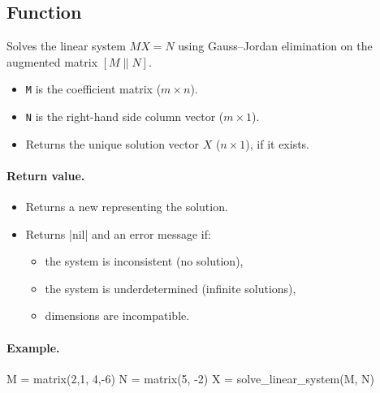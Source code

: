 \subsection{Function }
Solves the linear system $MX = N$ using Gauss–Jordan elimination on the augmented matrix $[M\|N]$.

\begin{itemize}
\item \texttt{M} is the coefficient matrix ($m \times n$).
\item \texttt{N} is the right-hand side column vector ($m \times 1$).
\item Returns the unique solution vector $X$ ($n \times 1$), if it exists.
\end{itemize}

\paragraph{Return value.}
\begin{itemize}
\item Returns a new  representing the solution.
\item Returns |nil| and an error message if:
\begin{itemize}
\item the system is inconsistent (no solution),
\item the system is underdetermined (infinite solutions),
\item dimensions are incompatible.
\end{itemize}
\end{itemize}

\paragraph{Example.}
\begin{tkzexample}
M = matrix({{2,1}, {4,-6}})
N = matrix({{5}, {-2}})
X = solve_linear_system(M, N)
\end{tkzexample}
\endinput